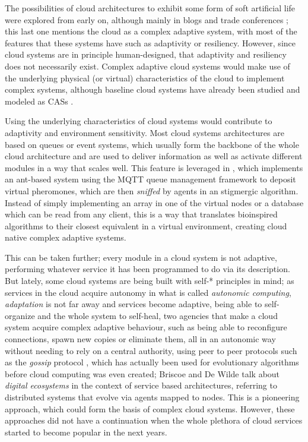\documentclass[utf8]{frontiersSCNS} %
\begin{document}
The possibilities of cloud architectures to exhibit some form of soft
artificial life were explored from early on, although mainly in blogs
and trade conferences \citep{burela09:Azure,hakimi}; this last one
mentions the cloud as a complex adaptive system, with most of the
features that these systems have such as adaptivity or resiliency.
However, since cloud systems are in principle
human-designed, that adaptivity and resiliency does not necessarily
exist. Complex adaptive cloud systems would make use of the underlying physical (or
virtual) characteristics of the cloud to implement complex
systems, although baseline cloud systems have already been studied and
modeled as CASs \citep{chen2013cloud}.

Using the underlying characteristics of cloud systems would
contribute to adaptivity and environment sensitivity.
Most cloud systems architectures are based on queues or event systems, which
usually form the backbone of the whole cloud architecture and are used to deliver
information as well as activate different modules in a way that scales
well. This feature is leveraged in \citep{bottone2016implementing}, which
implements an ant-based system using the MQTT queue management
framework to deposit virtual pheromones, which are then {\em sniffed} by
agents in an stigmergic algorithm. Instead of simply implementing an
array in one of the virtual nodes or a database which can be read from
any client, this is a way that translates bioinspired algorithms to
their closest equivalent in a virtual environment, creating cloud
native complex adaptive systems.

This can be taken further; every module in a cloud system is not
adaptive, performing whatever service it has been programmed to do via
its description. But lately, some cloud systems are being built with
self-* principles in mind; as services in the cloud acquire autonomy
in what is called {\em autonomic computing}, {\em adaptation} is not far away
and services become adaptive, being able to self-organize and the
whole system to self-heal, two agencies that make a cloud system
acquire complex adaptive behaviour, such as being able to reconfigure
connections, spawn new copies or eliminate them, all in an autonomic
way without needing to rely on a central authority, using peer to peer
protocols such as the {\em gossip} protocol \citep{LNCS44480129}, which has
actually been used for evolutionary algorithms \citep{laredo09cache} before
cloud computing was even created;  Briscoe and De Wilde
\citep{DBLP:journals/corr/abs-1101-5428,DBLP:journals/corr/abs-0712-4102}
  talk about {\em digital ecosystems} in the context of service based
  architectures, referring to distributed systems that evolve via
  agents mapped to nodes. This is a pioneering approach, which could
  form the basis of complex cloud systems. However, these approaches
  did not have a continuation when the whole plethora of cloud
  services started to become popular in the next years.
\end{document}
